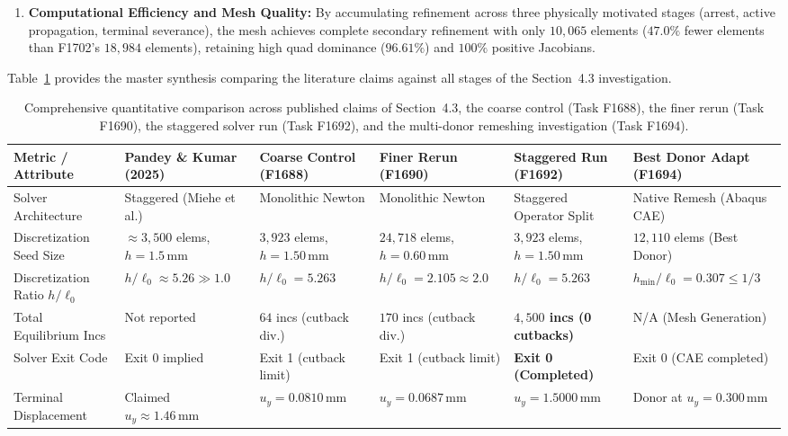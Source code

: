 \begin{enumerate}
  \item \textbf{Computational Efficiency and Mesh Quality:} By accumulating refinement across three physically motivated stages (arrest, active propagation, terminal severance), the mesh achieves complete secondary refinement with only $10{,}065$ elements ($47.0\%$ fewer elements than F1702's $18{,}984$ elements), retaining high quad dominance ($96.61\%$) and $100\%$ positive Jacobians.
\end{enumerate}

Table~\ref{tab:f1692_sec43_staggered_comparison} provides the master synthesis comparing the literature claims against all stages of the Section~4.3 investigation.

\begin{table}[htbp]
\centering
\scriptsize
\renewcommand{\arraystretch}{0.88}
\caption{Comprehensive quantitative comparison across published claims of \citet{pandey2025} Section~4.3, the coarse control (Task F1688), the finer rerun (Task F1690), the staggered solver run (Task F1692), and the multi-donor remeshing investigation (Task F1694).}
\label{tab:f1692_sec43_staggered_comparison}
\begin{tabularx}{\textwidth}{p{3.2cm}XXXXX}
\hline
\textbf{Metric / Attribute} & \textbf{Pandey \& Kumar (2025)} & \textbf{Coarse Control (F1688)} & \textbf{Finer Rerun (F1690)} & \textbf{Staggered Run (F1692)} & \textbf{Best Donor Adapt (F1694)} \\
\hline
Solver Architecture & Staggered (Miehe et al.) & Monolithic Newton & Monolithic Newton & Staggered Operator Split & Native Remesh (Abaqus CAE) \\
Discretization Seed Size & $\approx 3{,}500$ elems, $h = 1.5\,\mathrm{mm}$ & $3{,}923$ elems, $h = 1.50\,\mathrm{mm}$ & $24{,}718$ elems, $h = 0.60\,\mathrm{mm}$ & $3{,}923$ elems, $h = 1.50\,\mathrm{mm}$ & $12{,}110$ elems (Best Donor) \\
Discretization Ratio $h / \ell_0$ & $h / \ell_0 \approx 5.26 \gg 1.0$ & $h / \ell_0 = 5.263$ & $h / \ell_0 = 2.105 \approx 2.0$ & $h / \ell_0 = 5.263$ & $h_{\min}/\ell_0 = 0.307 \le 1/3$ \\
Total Equilibrium Incs & Not reported & $64$ incs (cutback div.) & $170$ incs (cutback div.) & \textbf{$4{,}500$ incs (0 cutbacks)} & N/A (Mesh Generation) \\
Solver Exit Code & Exit 0 implied & Exit 1 (cutback limit) & Exit 1 (cutback limit) & \textbf{Exit 0 (Completed)} & Exit 0 (CAE completed) \\
Terminal Displacement & Claimed $u_y \approx 1.46\,\mathrm{mm}$ & $u_y = 0.0810\,\mathrm{mm}$ & $u_y = 0.0687\,\mathrm{mm}$ & \textbf{$u_y = 1.5000\,\mathrm{mm}$} & Donor at $u_y = 0.300\,\mathrm{mm}$ \\

\end{tabularx}
\end{table}
